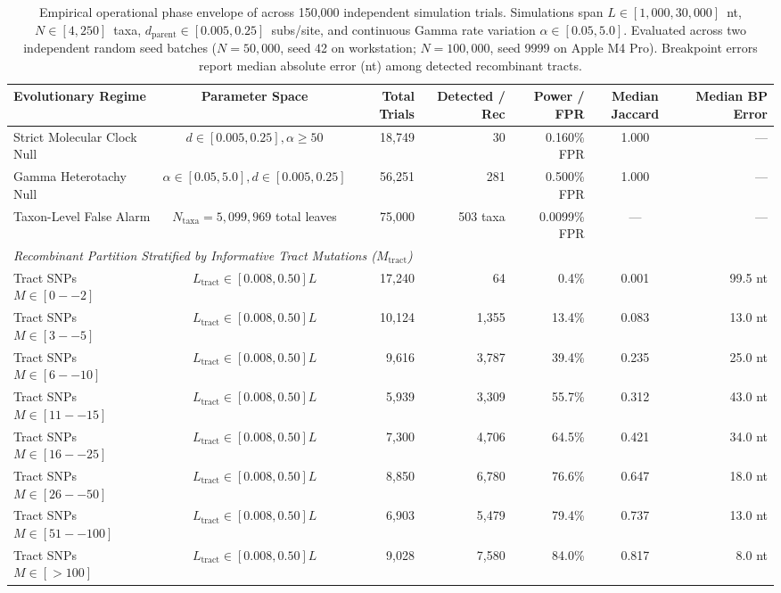\begin{table}[t!]
\centering
\footnotesize
\caption{Empirical operational phase envelope of \RhizAeon across 150,000 independent simulation trials.
Simulations span $L \in [1{,}000, 30{,}000]$~nt, $N \in [4, 250]$~taxa, $d_{\mathrm{parent}} \in [0.005, 0.25]$~subs/site, and continuous Gamma rate variation $\alpha \in [0.05, 5.0]$. Evaluated across two independent random seed batches ($N=50{,}000$, seed 42 on workstation; $N=100{,}000$, seed 9999 on Apple M4 Pro). Breakpoint errors report median absolute error (nt) among detected recombinant tracts.}
\label{tab:grand_sweep_150k_envelope}
{\setlength{\tabcolsep}{4.0pt}
\begin{tabular*}{\textwidth}{@{\extracolsep{\fill}}l c r r r c r@{}}
\toprule
Evolutionary Regime & Parameter Space & Total Trials & Detected / Rec & Power / FPR & Median Jaccard & Median BP Error \\
\midrule
Strict Molecular Clock Null & $d \in [0.005, 0.25], \alpha \ge 50$ & 18,749 & 30 & 0.160\% FPR & 1.000 & --- \\
Gamma Heterotachy Null & $\alpha \in [0.05, 5.0], d \in [0.005, 0.25]$ & 56,251 & 281 & 0.500\% FPR & 1.000 & --- \\
Taxon-Level False Alarm & $N_{\mathrm{taxa}} = 5,099,969$ total leaves & 75,000 & 503 taxa & 0.0099\% FPR & --- & --- \\
\midrule
\multicolumn{7}{l}{\textit{Recombinant Partition Stratified by Informative Tract Mutations ($M_{\mathrm{tract}}$)}} \\
Tract SNPs $M \in [0--2]$ & $L_{\mathrm{tract}} \in [0.008, 0.50] L$ & 17,240 & 64 & 0.4\% & 0.001 & 99.5 nt \\
Tract SNPs $M \in [3--5]$ & $L_{\mathrm{tract}} \in [0.008, 0.50] L$ & 10,124 & 1,355 & 13.4\% & 0.083 & 13.0 nt \\
Tract SNPs $M \in [6--10]$ & $L_{\mathrm{tract}} \in [0.008, 0.50] L$ & 9,616 & 3,787 & 39.4\% & 0.235 & 25.0 nt \\
Tract SNPs $M \in [11--15]$ & $L_{\mathrm{tract}} \in [0.008, 0.50] L$ & 5,939 & 3,309 & 55.7\% & 0.312 & 43.0 nt \\
Tract SNPs $M \in [16--25]$ & $L_{\mathrm{tract}} \in [0.008, 0.50] L$ & 7,300 & 4,706 & 64.5\% & 0.421 & 34.0 nt \\
Tract SNPs $M \in [26--50]$ & $L_{\mathrm{tract}} \in [0.008, 0.50] L$ & 8,850 & 6,780 & 76.6\% & 0.647 & 18.0 nt \\
Tract SNPs $M \in [51--100]$ & $L_{\mathrm{tract}} \in [0.008, 0.50] L$ & 6,903 & 5,479 & 79.4\% & 0.737 & 13.0 nt \\
Tract SNPs $M \in [>100]$ & $L_{\mathrm{tract}} \in [0.008, 0.50] L$ & 9,028 & 7,580 & 84.0\% & 0.817 & 8.0 nt \\
\bottomrule
\end{tabular*}}
\end{table}
